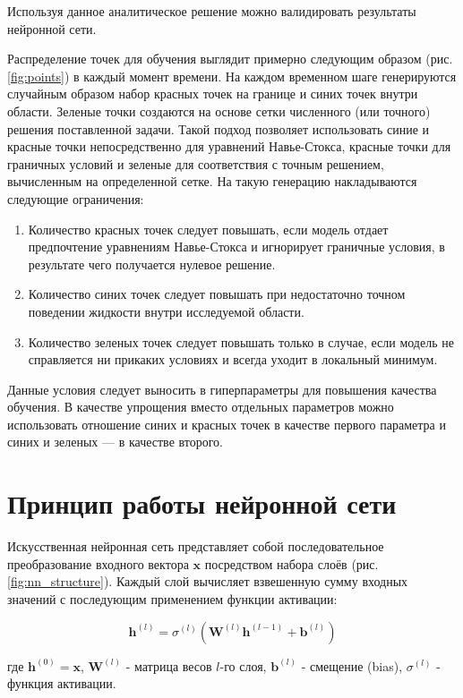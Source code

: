 

Используя данное аналитическое решение можно валидировать результаты нейронной сети.

Распределение точек для обучения выглядит примерно следующим образом
(рис. \ref{fig:points}) в каждый момент времени. На каждом временном шаге генерируются случайным
образом набор красных точек на границе и синих точек внутри области. Зеленые точки создаются на 
основе сетки численного (или точного) решения поставленной задачи. Такой подход позволяет использовать
синие и красные точки непосредственно для уравнений Навье-Стокса, красные точки для
граничных условий и зеленые для соответствия с точным решением, вычисленным на определенной
сетке. На такую генерацию накладываются следующие ограничения:
\begin{enumerate}
    \item Количество красных точек следует повышать, если модель отдает предпочтение уравнениям Навье-Стокса
    и игнорирует граничные условия, в результате чего получается нулевое решение.
    \item Количество синих точек следует повышать при недостаточно точном поведении жидкости внутри исследуемой
    области.
    \item Количество зеленых точек следует повышать только в случае, если модель не справляется ни прикаких
    условиях и всегда уходит в локальный минимум.
\end{enumerate}
Данные условия следует выносить в гиперпараметры для повышения качества обучения. В качестве упрощения вместо отдельных
параметров можно использовать отношение синих и красных точек в качестве первого параметра и синих и зеленых --- в 
качестве второго. 


\section{Принцип работы нейронной сети}

Искусственная нейронная сеть представляет собой последовательное преобразование
входного вектора $\mathbf{x}$ посредством набора слоёв (рис. \ref{fig:nn_structure}).
Каждый слой вычисляет взвешенную сумму входных значений с последующим применением
функции активации:



$$
\mathbf{h}^{(l)} = \sigma^{(l)}\left( \mathbf{W}^{(l)} \mathbf{h}^{(l-1)} + \mathbf{b}^{(l)} \right)
$$

где $\mathbf{h}^{(0)} = \mathbf{x}$, $\mathbf{W}^{(l)}$ - матрица весов $l$-го слоя, $\mathbf{b}^{(l)}$ - смещение (bias), $\sigma^{(l)}$ - функция активации.

